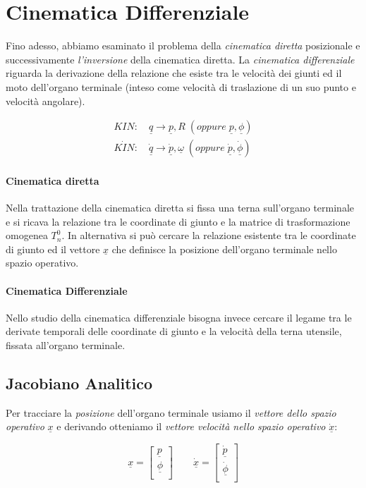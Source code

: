 \chapter{Cinematica Differenziale}
Fino adesso, abbiamo esaminato il problema della \emph{cinematica diretta} posizionale e successivamente \emph{l'inversione} della cinematica diretta. La \emph{cinematica differenziale} riguarda la derivazione della relazione che esiste tra le velocità dei giunti ed il moto dell'organo terminale (inteso come velocità di traslazione di un suo punto e velocità angolare).

\begin{align}
	KIN: \quad \underline{q} \longrightarrow \underline{p}, R \;(oppure\; \underline{p}, \underline{\phi}) \\
	\dot{KIN}: \quad \dot{\underline{q}} \longrightarrow \dot{\underline{p}}, \underline{\omega}\;(oppure\; \dot{\underline{p}}, \dot{\underline{\phi}})
\end{align}
	
\subsubsection{Cinematica diretta}
Nella trattazione della cinematica diretta si fissa una terna sull'organo terminale e si ricava la relazione tra le coordinate di giunto e la matrice di trasformazione omogenea $T_n^0$. In alternativa si può cercare la relazione esistente tra le coordinate di giunto ed il vettore $\underline{x}$ che definisce la posizione dell'organo terminale nello spazio operativo.

\subsubsection{Cinematica Differenziale}
Nello studio della cinematica differenziale bisogna invece cercare il legame tra le derivate temporali delle coordinate di giunto e la velocità della terna utensile, fissata all'organo terminale.

\section{Jacobiano Analitico}
Per tracciare la \emph{posizione} dell'organo terminale usiamo il \emph{vettore dello spazio operativo} $\underline{x}$ e derivando otteniamo il \emph{vettore velocità nello spazio operativo} $\dot{\underline{x}}$:

\begin{equation}
	\underline{x} = 
	\begin{bmatrix}
		\underline{p} \\
		\underline{\phi} \\
	\end{bmatrix}
	\qquad \dot{\underline{x}} = 
	\begin{bmatrix}
		\dot{\underline{p}} \\
		\dot{\underline{\phi}} \\
	\end{bmatrix}
\end{equation}


